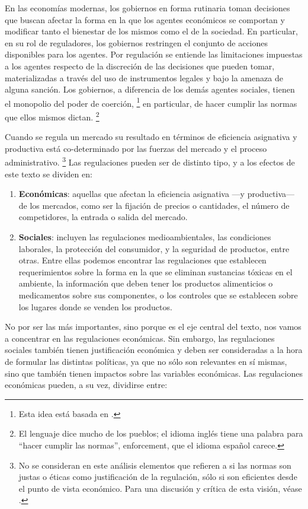 \documentclass[
  12pt,
  spanish,
]{book}
\begin{document}
En las economías modernas, los gobiernos en forma rutinaria toman decisiones que buscan afectar la forma en la que los agentes económicos se comportan y modificar tanto el bienestar de los mismos como el de la sociedad. En particular, en su rol de reguladores, los gobiernos restringen el conjunto de acciones disponibles para los agentes. Por regulación se entiende las limitaciones impuestas a los agentes respecto de la discreción de las decisiones que pueden tomar, materializadas a través del uso de instrumentos legales y bajo la amenaza de alguna sanción. Los gobiernos, a diferencia de los demás agentes sociales, tienen el monopolio del poder de coerción,
\footnote{Esta idea está basada en \citep{Weber1921}.}
en particular, de hacer cumplir las normas que ellos mismos dictan.
\footnote{El lenguaje dice mucho de los pueblos; el idioma inglés tiene una palabra para ``hacer cumplir las normas'', enforcement, que el idioma español carece.}

Cuando se regula un mercado su resultado en términos de eficiencia asignativa y productiva está co-determinado por las fuerzas del mercado y el proceso administrativo.
\footnote{No se consideran en este análisis elementos que refieren a si las normas son justas o éticas como justificación de la regulación, sólo si son eficientes desde el punto de vista económico. Para una discusión y crítica de esta visión, véase \citep[capítulo 3]{Baldwin2011}.}
Las regulaciones pueden ser de distinto tipo, y a los efectos de este texto se dividen en:

\begin{enumerate}
\def\labelenumi{\arabic{enumi}.}
\item
  \textbf{Económicas}: aquellas que afectan la eficiencia asignativa ---y productiva---
  de los mercados, como ser la fijación de precios o cantidades, el número de
  competidores, la entrada o salida del mercado.
\item
  \textbf{Sociales}: incluyen las regulaciones medioambientales, las condiciones laborales, la protección del consumidor, y la seguridad de productos, entre otras. Entre ellas podemos encontrar las regulaciones que establecen requerimientos sobre la forma en la que se eliminan sustancias tóxicas en el ambiente, la información que deben tener los productos alimenticios o medicamentos sobre sus componentes, o los controles que se establecen sobre los lugares donde se venden los productos.
\end{enumerate}

No por ser las más importantes, sino porque es el eje central del texto, nos vamos a concentrar en las regulaciones económicas. Sin embargo, las regulaciones sociales también tienen justificación económica y deben ser consideradas a la hora de formular las distintas políticas, ya que no sólo son relevantes en sí mismas, sino que también tienen impactos sobre las variables económicas. Las regulaciones económicas pueden, a su vez, dividirse entre:
\end{document}
